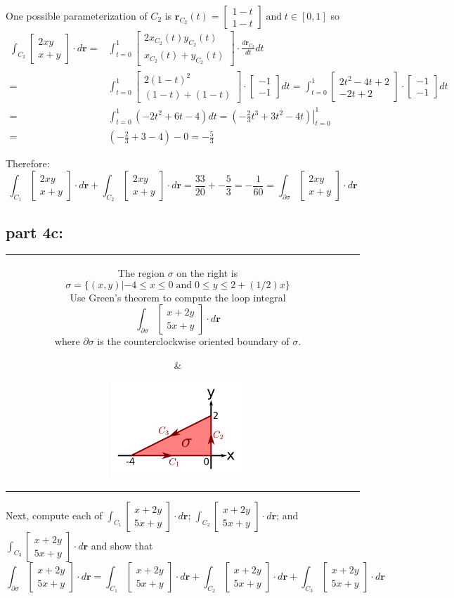 \documentclass{article}
\newcommand{\colxyvec}[2]{\begin{bmatrix} #1 \\ #2 \end{bmatrix}}
\newcommand{\at}[1]{\left. #1 \right|}
\newcommand{\dr}[1]{\textcolor{dark_red}{#1}}
\begin{document}
\dr{One possible parameterization of \(C_2\) is \(\mathbf{r}_{C_2}(t) = \colxyvec{1-t}{1-t} \;\text{and}\; t \in [0,1]\) so
\begin{align*}
\int_{C_2} \colxyvec{2xy}{x+y} \cdot d\mathbf{r} = & \int_{t=0}^1 \colxyvec{2x_{C_2}(t)y_{C_2}(t)}{x_{C_2}(t)+y_{C_2}(t)} \cdot \frac{d\mathbf{r}_{C_2}}{dt}dt \\ 
= & \int_{t=0}^1 \colxyvec{2(1-t)^2}{(1-t) + (1-t)} \cdot \colxyvec{-1}{-1}dt 
= \int_{t=0}^1 \colxyvec{2t^2 - 4t + 2}{-2t + 2} \cdot \colxyvec{-1}{-1}dt \\
= & \int_{t=0}^1 (-2t^2 + 6t - 4)dt 
= \at{(-\frac{2}{3}t^3 + 3t^2 - 4t)}_{t=0}^1 \\
= & (-\frac{2}{3} + 3 - 4) - 0 
= -\frac{5}{3}
\end{align*}}

\dr{Therefore: \[\int_{C_1} \colxyvec{2xy}{x+y} \cdot d\mathbf{r} + \int_{C_2} \colxyvec{2xy}{x+y} \cdot d\mathbf{r} = \frac{33}{20} + -\frac{5}{3} = -\frac{1}{60} = \int_{\partial\sigma} \colxyvec{2xy}{x+y} \cdot d\mathbf{r}\]}



\subsection*{part 4c:}

\begin{tabular}{cc}
\parbox{0.6\textwidth}{ 
The region \(\sigma\) on the right is 
\[\sigma = \{(x,y) | -4 \leq x \leq 0 \;\text{and}\; 0 \leq y \leq 2 + (1/2)x\}\]
Use Green's theorem to compute the loop integral
\[\int_{\partial\sigma} \colxyvec{x+2y}{5x+y} \cdot d\mathbf{r}\]
where \(\partial\sigma\) is the counterclockwise oriented boundary of \(\sigma\).
} & \parbox{0.4\textwidth}{
\includegraphics[width = 0.4\textwidth]{Test_bench_part_4x_images/Test_bench_part_4x_image_3}
}
\end{tabular}
Next, compute each of \(\int_{C_1} \colxyvec{x+2y}{5x+y} \cdot d\mathbf{r}\); \(\int_{C_2} \colxyvec{x+2y}{5x+y} \cdot d\mathbf{r}\); and \(\int_{C_3} \colxyvec{x+2y}{5x+y} \cdot d\mathbf{r}\) and show that 
\[\int_{\partial\sigma} \colxyvec{x+2y}{5x+y} \cdot d\mathbf{r} = \int_{C_1} \colxyvec{x+2y}{5x+y} \cdot d\mathbf{r} + \int_{C_2} \colxyvec{x+2y}{5x+y} \cdot d\mathbf{r} + \int_{C_3} \colxyvec{x+2y}{5x+y} \cdot d\mathbf{r}\]  
\end{document}
